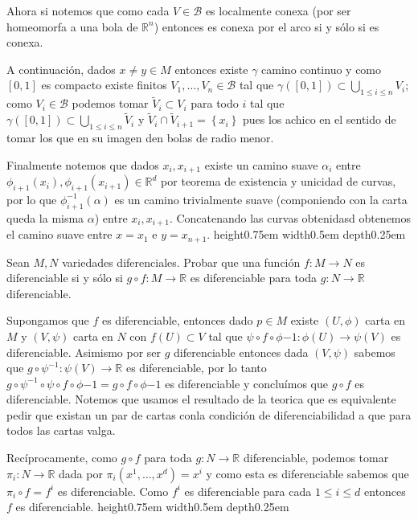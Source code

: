 \documentclass[11pt]{article}
\newcommand{\B}{\mathcal{B}}
\newcommand{\R}{{\mathbb{R}}}
\newcommand{\sett}[1]{\left\lbrace#1\right\rbrace}
\newcommand{\Bigcup}[2]{\bigcup\limits_{#1}{#2}}
\numberwithin{theorem}{subsection}
\newenvironment{proof}[1][Demostraci\'on]{\begin{trivlist}
		\item[\hskip \labelsep {\bfseries #1}]}{\end{trivlist}}
\newcommand{\qed}{\nobreak \ifvmode \relax \else
	\ifdim\lastskip<1.5em \hskip-\lastskip
	\hskip1.5em plus0em minus0.5em \fi \nobreak
	\vrule height0.75em width0.5em depth0.25em\fi}
\begin{document}
\begin{solution}
\begin{proof}
	\end{proof}
	
	Ahora si notemos que como cada $V \in \B$ es localmente conexa (por ser homeomorfa a una bola de $\R^n$) entonces es conexa por el arco si y s\'olo si es conexa. 
	
	A continuaci\'on, dados $x \neq y \in M$ entonces existe $\gamma$ camino continuo y como $[0,1]$ es compacto existe finitos $V_1, \dots , V_n \in \B$ tal que $\gamma([0,1]) \subset \Bigcup{1 \leq i \leq n}{V_i}$; como $V_i \in \B$ podemos tomar $\tilde{V}_i \subset V_i$ para todo $i$ tal que $\gamma([0,1]) \subset \Bigcup{1 \leq i \leq n}{\tilde{V}_i}$ y $\tilde{V}_i \cap \tilde{V}_{i+1} = \sett{x_{i}}$ pues los achico en el sentido de tomar los que en su imagen den bolas de radio menor. 
	
	Finalmente notemos que dados $x_i, x_{i+1}$ existe un camino suave $\alpha_i$ entre $\phi_{i+1}(x_i), \phi_{i+1}(x_{i+1}) \in \R^d$ por teorema de existencia y unicidad de curvas, por lo que $\phi_{i+1}^{-1}(\alpha)$ es un camino trivialmente suave (componiendo con la carta queda la misma $\alpha$) entre $x_i, x_{i+1}$. Concatenando las curvas obtenidasd obtenemos el camino suave entre $x = x_{1}$ e $y = x_{n+1}$. \qed
	
\end{solution}

\begin{question}
	Sean $M,N$ variedades diferenciales. Probar que una funci\'on $f:M\to N$ es diferenciable si y s\'olo si $g\circ f:M\to\R$ es diferenciable para toda $g:N\to\R$ diferenciable.
\end{question}

\begin{solution}
	Supongamos que $f$ es diferenciable, entonces dado $p \in M$ existe $(U, \phi)$ carta en $M$ y $(V,\psi)$ carta en $N$ con $f(U) \subset V$ tal que $\psi \circ f \circ \phi{-1}: \phi(U) \rightarrow \psi(V)$ es diferenciable. Asimismo por ser $g$ diferenciable entonces dada $(V,\psi)$ sabemos que $g \circ \psi^{-1} : \psi(V) \rightarrow \R$ es diferenciable, por lo tanto $g \circ \psi^{-1} \circ \psi \circ f \circ \phi{-1} = g \circ f \circ \phi{-1}$ es diferenciable y conclu\'imos que $g \circ f$ es diferenciable. Notemos que usamos el resultado de la teorica que es equivalente pedir que existan un par de cartas conla condici\'on de diferenciabilidad a que para todos las cartas valga.
	
	Rec\'iprocamente, como $g \circ f$ para toda $g: N \rightarrow \R$ diferenciable, podemos tomar $\pi_i :N \rightarrow \R$ dada por $\pi_i(x^1, \dots, x^d) = x^i$ y como esta es diferenciable sabemos que $\pi_i \circ f = f^i$ es diferenciable. Como $f^i$ es diferenciable para cada $1 \leq i \leq d$ entonces $f$ es diferenciable. \qed
	
\end{solution}
\end{document}
